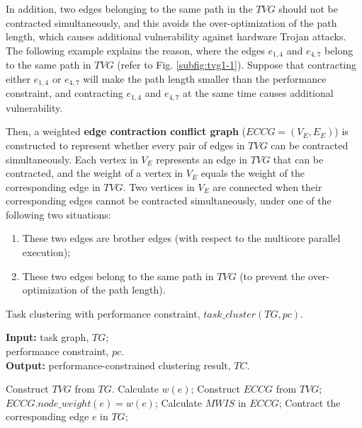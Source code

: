 \documentclass[10pt,journal, compsoc]{IEEEtran}
\begin{document}
In addition, two edges belonging to the same path in the $TVG$ should not be contracted simultaneously, and this avoids the over-optimization of the path length, which causes additional vulnerability against hardware Trojan attacks. The following example explains the reason, where the edges $e_{1,4}$ and $e_{4,7}$ belong to the same path in $TVG$ (refer to Fig. \ref{subfig:tvg1-1}). Suppose that contracting either $e_{1,4}$ or $e_{4,7}$ will make the path length smaller than the performance constraint, and contracting $e_{1,4}$ and $e_{4,7}$ at the same time causes additional vulnerability.


Then, a weighted \textbf{edge contraction conflict graph} ($ECCG=(V_E,E_E)$) is constructed to represent whether every pair of edges in $TVG$ can be contracted simultaneously. Each vertex in $V_E$ represents an edge in $TVG$ that can be contracted, and the weight of a vertex in $V_E$ equals the weight of the corresponding edge in $TVG$. Two vertices in $V_E$ are connected when their corresponding edges cannot be contracted simultaneously, under one of the following two situations:
\begin{enumerate}
\item These two edges are brother edges (with respect to the multicore parallel execution);
\item These two edges belong to the same path in $TVG$ (to prevent the over-optimization of the path length).
\end{enumerate}




\begin{algorithm}[!t]
\caption{Task clustering with performance constraint, $task\_cluster(TG, pc)$.}
\label{alg:PCTC}
\begin{flushleft}
{\textbf{Input:}}
task graph, $TG$;\\
\hspace*{2.8em}performance constraint, $pc$.\\
{\textbf{Output:}} performance-constrained clustering result, $TC$.
\end{flushleft}
\begin{algorithmic}[1]
\STATE Construct $TVG$ from $TG$.
\STATE Calculate $w(e)$;
\ENDFOR
\STATE Construct $ECCG$ from $TVG$;
\STATE $ECCG.node\_weight(e)=w(e)$;
\ENDFOR
\STATE Calculate $MWIS$ in $ECCG$;
    \STATE Contract the corresponding edge $e$ in $TG$;
\ENDFOR
\ENDWHILE
\end{algorithmic}
\end{algorithm}
\end{document}
